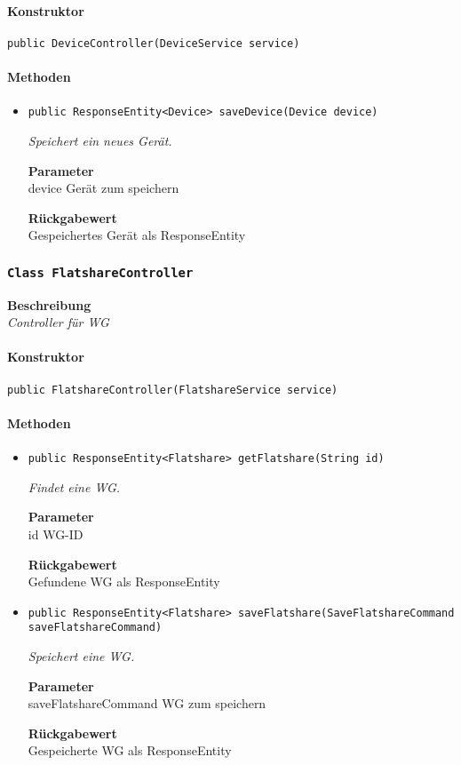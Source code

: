     \paragraph*{Konstruktor}
    \texttt{public DeviceController(DeviceService service)}
    \paragraph*{Methoden}
    \begin{itemize}
    	\item{\texttt{public ResponseEntity<Device> saveDevice(Device device)}}
    	
    	\textit{Speichert ein neues Gerät.}
    	
    	\textbf{Parameter} \\
    	device Gerät zum speichern
    	
    	\textbf{Rückgabewert} \\
    	Gespeichertes Gerät als ResponseEntity
    \end{itemize}
    \subsubsection{\texttt{Class FlatshareController}}
    \textbf{Beschreibung} \\
    \textit{Controller für WG}
    \paragraph*{Konstruktor}
    \texttt{public FlatshareController(FlatshareService service)}
    \paragraph*{Methoden}
    \begin{itemize}
    	\item{\texttt{public ResponseEntity<Flatshare> getFlatshare(String id)}}
    	
    	\textit{Findet eine WG.}
    	
    	\textbf{Parameter} \\
    	id WG-ID
    	
    	\textbf{Rückgabewert} \\
    	Gefundene WG als ResponseEntity        \item{\texttt{public ResponseEntity<Flatshare> saveFlatshare(SaveFlatshareCommand saveFlatshareCommand)}}
    	
    	\textit{Speichert eine WG.}
    	
    	\textbf{Parameter} \\
    	saveFlatshareCommand WG zum speichern
    	
    	\textbf{Rückgabewert} \\
    	Gespeicherte WG als ResponseEntity
    \end{itemize}
